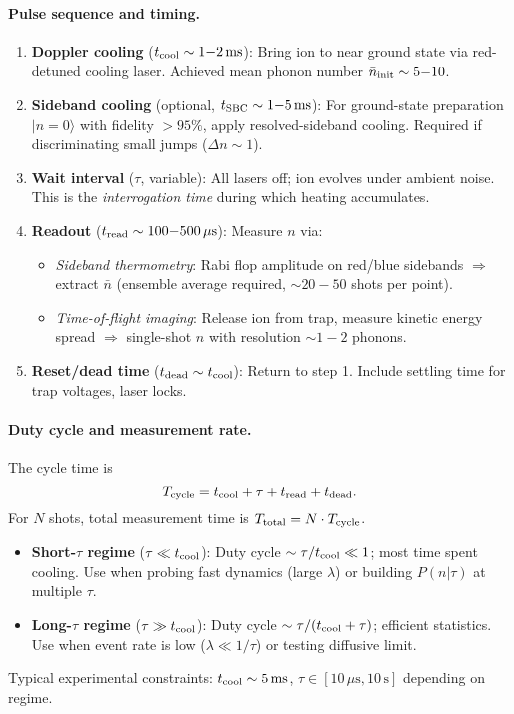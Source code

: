 \paragraph{Pulse sequence and timing.}

\begin{enumerate}
\item \textbf{Doppler cooling} ($t_{\rm cool} \sim 1{-}2\,\text{ms}$): 
  Bring ion to near ground state via red-detuned cooling laser. 
  Achieved mean phonon number $\bar{n}_{\rm init} \sim 5{-}10$.

\item \textbf{Sideband cooling} (optional, $t_{\rm SBC} \sim 1{-}5\,\text{ms}$): 
  For ground-state preparation $|n=0\rangle$ with fidelity $>95\%$, 
  apply resolved-sideband cooling. 
  Required if discriminating small jumps ($\Delta n \sim 1$).

\item \textbf{Wait interval} ($\tau$, variable): 
  All lasers off; ion evolves under ambient noise. 
  This is the \emph{interrogation time} during which heating accumulates.

\item \textbf{Readout} ($t_{\rm read} \sim 100{-}500\,\mu\text{s}$): 
  Measure $n$ via:
  \begin{itemize}
    \item \emph{Sideband thermometry}: Rabi flop amplitude on red/blue sidebands 
      $\Rightarrow$ extract $\bar{n}$ (ensemble average required, $\sim 20{-}50$ shots per point).
    \item \emph{Time-of-flight imaging}: Release ion from trap, measure kinetic energy 
      spread $\Rightarrow$ single-shot $n$ with resolution $\sim 1{-}2$ phonons.
  \end{itemize}
  
\item \textbf{Reset/dead time} ($t_{\rm dead} \sim t_{\rm cool}$): 
  Return to step 1. Include settling time for trap voltages, laser locks.
\end{enumerate}

\paragraph{Duty cycle and measurement rate.}
The cycle time is
\[
T_{\rm cycle} = t_{\rm cool} + \tau + t_{\rm read} + t_{\rm dead}.
\]
For $N$ shots, total measurement time is $T_{\rm total} = N \cdot T_{\rm cycle}$.
\begin{itemize}
\item \textbf{Short-$\tau$ regime} ($\tau \ll t_{\rm cool}$): 
  Duty cycle $\sim \tau/t_{\rm cool} \ll 1$; 
  most time spent cooling. 
  Use when probing fast dynamics (large $\lambda$) or building $P(n|\tau)$ at multiple $\tau$.

\item \textbf{Long-$\tau$ regime} ($\tau \gg t_{\rm cool}$): 
  Duty cycle $\sim \tau/(t_{\rm cool}+\tau)$; 
  efficient statistics. 
  Use when event rate is low ($\lambda \ll 1/\tau$) or testing diffusive limit.
\end{itemize}
Typical experimental constraints: $t_{\rm cool} \sim 5\,\text{ms}$, 
$\tau \in [10\,\mu\text{s}, 10\,\text{s}]$ depending on regime.

